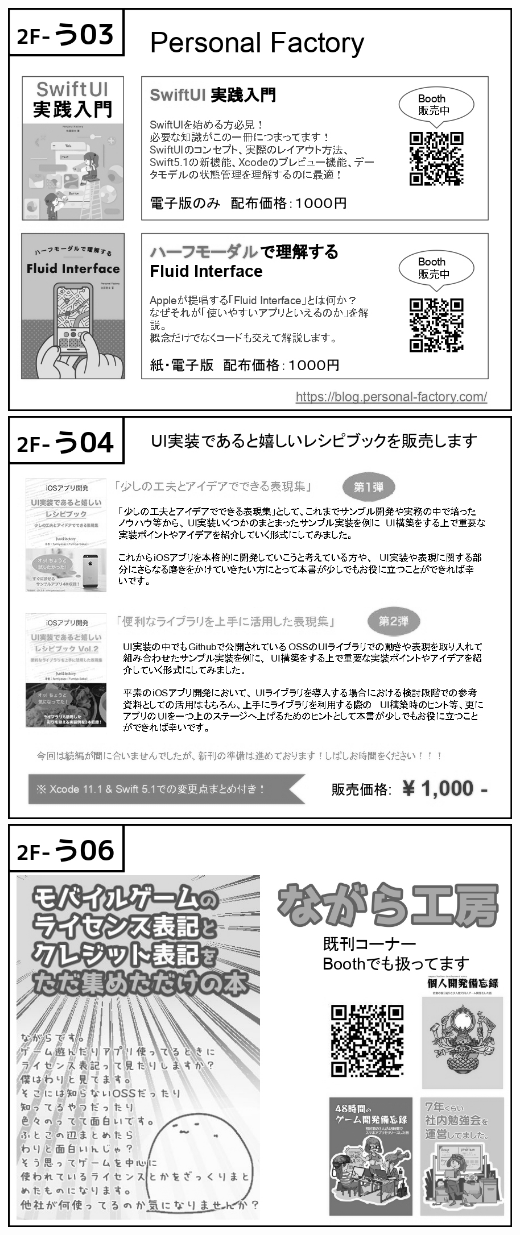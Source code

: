 \begin{center}
\includegraphics[width=0.9\linewidth]{images/circle-appeals/2F-う03.jpg}
\includegraphics[width=0.9\linewidth]{images/circle-appeals/2F-う04.jpg}
\includegraphics[width=0.9\linewidth]{images/circle-appeals/2F-う06.jpg}

\end{center}
